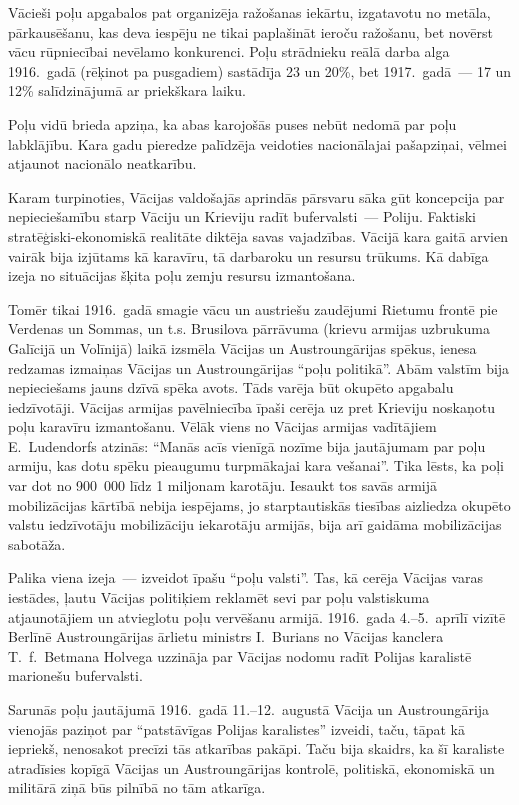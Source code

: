 \documentclass[twoside,a5paper,12pt,fleqn,openany]{extbook}
\begin{document}
Vācieši poļu apgabalos pat organizēja ražošanas iekārtu, izgatavotu no metāla, pārkausēšanu, kas deva iespēju ne tikai paplašināt ieroču ražošanu, bet novērst vācu rūpniecībai nevēlamo konkurenci. Poļu strādnieku reālā darba alga 1916.~gadā (rēķinot pa pusgadiem) sastādīja 23 un 20\%, bet 1917.~gadā~--- 17 un 12\% salīdzinājumā ar priekškara laiku.

Poļu vidū brieda apziņa, ka abas karojošās puses nebūt nedomā par poļu labklājību. Kara gadu pieredze palīdzēja veidoties nacionālajai pašapziņai, vēlmei atjaunot nacionālo neatkarību.

Karam turpinoties, Vācijas valdošajās aprindās pārsvaru sāka gūt koncepcija par nepieciešamību starp Vāciju un Krieviju radīt bufervalsti~--- Poliju. Faktiski stratēģiski-ekonomiskā realitāte diktēja savas vajadzības. Vācijā kara gaitā arvien vairāk bija izjūtams kā karavīru, tā darbaroku un resursu trūkums. Kā dabīga izeja no situācijas šķita poļu zemju resursu izmantošana.

Tomēr tikai 1916.~gadā smagie vācu un austriešu zaudējumi Rietumu frontē pie Verdenas un Sommas, un t.s. Brusilova pārrāvuma (krievu armijas uzbrukuma Galīcijā un Volīnijā) laikā izsmēla Vācijas un Austroungārijas spēkus, ienesa redzamas izmaiņas Vācijas un Austroungārijas ``poļu politikā''. Abām valstīm bija nepieciešams jauns dzīvā spēka avots. Tāds varēja būt okupēto apgabalu iedzīvotāji. Vācijas armijas pavēlniecība īpaši cerēja uz pret Krieviju noskaņotu poļu karavīru izmantošanu. Vēlāk viens no Vācijas armijas vadītājiem E.~Ludendorfs atzinās: ``Manās acīs vienīgā nozīme bija jautājumam par poļu armiju, kas dotu spēku pieaugumu turpmākajai kara vešanai''. Tika lēsts, ka poļi var dot no 900~000 līdz 1 miljonam karotāju. Iesaukt tos savās armijā mobilizācijas kārtībā nebija iespējams, jo starptautiskās tiesības aizliedza okupēto valstu iedzīvotāju mobilizāciju iekarotāju armijās, bija arī gaidāma mobilizācijas sabotāža.

Palika viena izeja~--- izveidot īpašu ``poļu valsti''. Tas, kā cerēja Vācijas varas iestādes, ļautu Vācijas politiķiem reklamēt sevi par poļu valstiskuma atjaunotājiem un atvieglotu poļu vervēšanu armijā. 1916.~gada 4.--5.~aprīlī vizītē Berlīnē Austroungārijas ārlietu ministrs I.~Burians no Vācijas kanclera T.~f.~Betmana Holvega uzzināja par Vācijas nodomu radīt Polijas karalistē marionešu bufervalsti.

Sarunās poļu jautājumā 1916.~gadā 11.--12.~augustā Vācija un Austroungārija vienojās paziņot par ``patstāvīgas Polijas karalistes'' izveidi, taču, tāpat kā iepriekš, nenosakot precīzi tās atkarības pakāpi. Taču bija skaidrs, ka šī karaliste atradīsies kopīgā Vācijas un Austroungārijas kontrolē, politiskā, ekonomiskā un militārā ziņā būs pilnībā no tām atkarīga.
\end{document}
